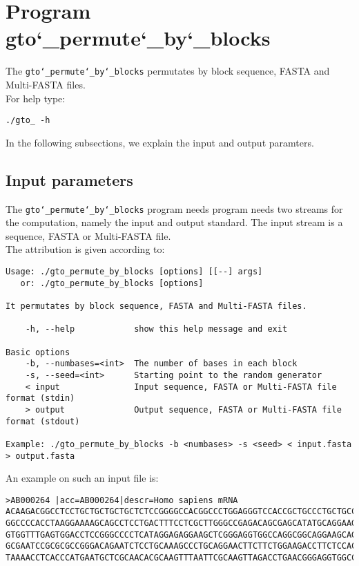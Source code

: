 \section{Program gto\char`_permute\char`_by\char`_blocks}
The \texttt{gto\char`_permute\char`_by\char`_blocks} permutates by block sequence, FASTA and Multi-FASTA files.\\
For help type:
\begin{lstlisting}
./gto_ -h
\end{lstlisting}
In the following subsections, we explain the input and output paramters.

\subsection*{Input parameters}

The \texttt{gto\char`_permute\char`_by\char`_blocks} program needs program needs two streams for the computation, namely the input and output standard. The input stream is a sequence, FASTA or Multi-FASTA file.\\
The attribution is given according to:
\begin{lstlisting}
Usage: ./gto_permute_by_blocks [options] [[--] args]
   or: ./gto_permute_by_blocks [options]

It permutates by block sequence, FASTA and Multi-FASTA files.

    -h, --help            show this help message and exit

Basic options
    -b, --numbases=<int>  The number of bases in each block
    -s, --seed=<int>      Starting point to the random generator
    < input               Input sequence, FASTA or Multi-FASTA file format (stdin)
    > output              Output sequence, FASTA or Multi-FASTA file format (stdout)

Example: ./gto_permute_by_blocks -b <numbases> -s <seed> < input.fasta > output.fasta
\end{lstlisting}
An example on such an input file is:
\begin{lstlisting}
>AB000264 |acc=AB000264|descr=Homo sapiens mRNA 
ACAAGACGGCCTCCTGCTGCTGCTGCTCTCCGGGGCCACGGCCCTGGAGGGTCCACCGCTGCCCTGCTGCCATTGTCCCC
GGCCCCACCTAAGGAAAAGCAGCCTCCTGACTTTCCTCGCTTGGGCCGAGACAGCGAGCATATGCAGGAAGCGGCAGGAA
GTGGTTTGAGTGGACCTCCGGGCCCCTCATAGGAGAGGAAGCTCGGGAGGTGGCCAGGCGGCAGGAAGCAGGCCAGTGCC
GCGAATCCGCGCGCCGGGACAGAATCTCCTGCAAAGCCCTGCAGGAACTTCTTCTGGAAGACCTTCTCCACCCCCCCAGC
TAAAACCTCACCCATGAATGCTCGCAACACGCAAGTTTAATTCGCAAGTTAGACCTGAACGGGAGGTGGCCACGCAAGTT
\end{lstlisting}

